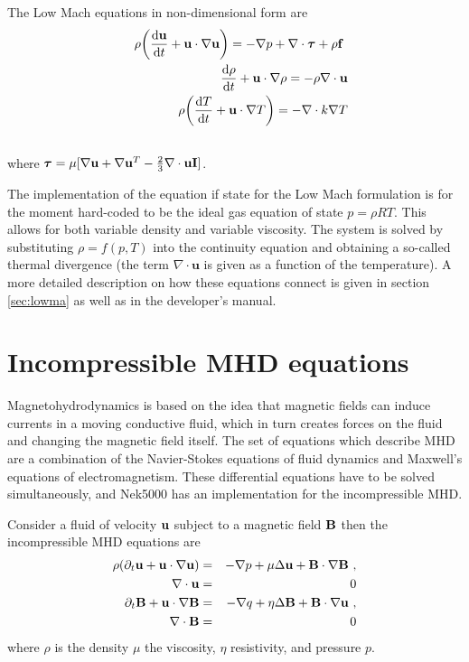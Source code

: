 {The Low Mach equations in non-dimensional form are 
\begin{eqnarray}
&&\rho\bigg(\frac{\mathrm{d} \mathbf{u}}{\mathrm{d} t}+ \mathbf{u}\cdot\nabla\mathbf{u}\bigg)=-\nabla p+\nabla \cdot\boldsymbol{\tau}+\rho\mathbf{f}\ \\ \nonumber
&&\frac{\mathrm{d} \mathbf{\rho}}{\mathrm{d} t}+ \mathbf{u}\cdot\nabla\mathbf{\rho}=-\rho\nabla \cdot \mathbf{u}\\ \nonumber
&&\rho\bigg(\frac{\mathrm{d} T}{\mathrm{d} t}+ \mathbf{u}\cdot\nabla T\bigg)=-\nabla \cdot k \nabla T\\ \nonumber
\end{eqnarray}
where \(\boldsymbol{\tau}=\mu[\nabla \mathbf{u}+\nabla \mathbf{u}^{T}-\frac{2}{3}\nabla \cdot \mathbf{u} \mathbf{I}]\).


The implementation of the equation if state for the Low Mach formulation is for the moment hard-coded to be the ideal gas equation of state \(p=\rho R T\). This allows for both variable density and variable viscosity. The system is solved by substituting \(\rho=f(p,T)\) into the continuity equation and obtaining a so-called thermal divergence (the term \(\nabla \cdot \mathbf u\) is given as a function of the temperature).
A more detailed description on how these equations connect is given in section \ref{sec:lowma} as well as in the developer's manual.

\section{Incompressible MHD equations}\label{sec:mhd}
Magnetohydrodynamics is based on the idea that magnetic fields can induce currents in a moving conductive fluid, which in turn creates forces on the fluid and changing the magnetic field itself. The set of equations which describe MHD are a combination of the Navier-Stokes equations of fluid dynamics and Maxwell's equations of electromagnetism. These differential equations have to be solved simultaneously, and Nek5000 has an implementation for the incompressible MHD.

Consider a fluid of velocity \(\mathbf{u}\) subject to a magnetic field \(\mathbf{B}\) then the incompressible MHD equations are
\begin{eqnarray}
 \rho(\partial_{t} \mathbf u + \mathbf u \cdot \nabla \mathbf u) &=& - \nabla p + \mu \Delta \mathbf u + \bB\cdot \nabla \bB \ ,\\ 
 \nabla \cdot \mathbf u & =& 0\\ \nonumber
   \partial_{t} \bB + \mathbf u \cdot \nabla \bB &=& - \nabla q + \eta \Delta \bB + \bB\cdot \nabla \mathbf u \ ,\\ 
    \nabla \cdot \bB & =& 0 \nonumber
\end{eqnarray}
where \(\rho\) is the density \(\mu\) the viscosity, \(\eta\) resistivity, and pressure \(p\).


}
